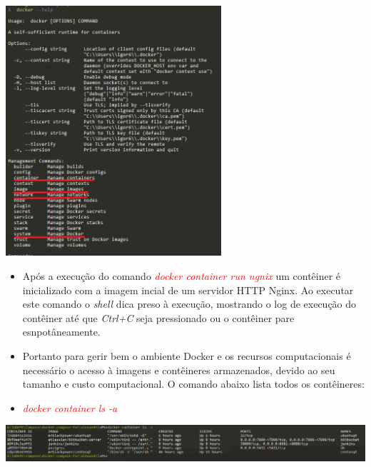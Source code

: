 \documentclass[10pt]{beamer}
\theoremstyle{remark}
\theoremstyle{definition}
\newcommand{\code}[1]{\textcolor{red} {\textit{#1}}} %
\begin{document}
\begin{frame}[allowframebreaks]
	\framebreak
		
	\begin{center}
		\includegraphics[width=0.6\textwidth]{images/06.png}
	\end{center}
	
	\framebreak	
	
	\begin{itemize}
		\item Após a execução do comando \code{docker container run ngnix} um contêiner é inicializado com a imagem incial de um servidor HTTP Nginx. Ao executar este comando o \textit{shell} dica preso à execução, mostrando o log de execução do contêiner até que \textit{Ctrl+C} seja pressionado ou o contêiner pare esnpotâneamente.
		
		\item Portanto para gerir bem o ambiente Docker e os recursos computacionais é necessário o acesso à imagens e contêineres armazenados, devido ao seu tamanho e custo computacional. O comando abaixo lista todos os contêineres:
		
		\item \code{docker container ls -a}
	\end{itemize}
	
	\framebreak
		
	\begin{center}
		\includegraphics[width=1\textwidth]{images/11.png}
	\end{center}
	
	\framebreak
	

\end{frame}
\end{document}
